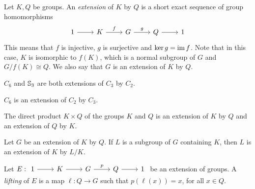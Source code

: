 \chapter{}



Let $K,Q$ be groups.
An {\em extension} of $K$ by $Q$ is a
short exact sequence of group homomorphisms 
\[
\begin{tikzcd}
	1 & K & G & Q & 1
	\arrow[from=1-1, to=1-2]
	\arrow["f", from=1-2, to=1-3]
	\arrow["g", from=1-3, to=1-4]
	\arrow[from=1-4, to=1-5]
\end{tikzcd}
\]
This means that $f$ is injective, $g$ is surjective and $\ker g=\operatorname{im} f$. Note that in this case, $K$ is isomorphic to $f(K)$, which is a normal subgroup of $G$ and $G/f(K)\cong Q$. We also say that $G$ is an extension of $K$ by $Q$.

\begin{example}
	$C_6$ and $\mathbb{S}_3$ are both extensions of $C_3$ by $C_2$.
\end{example}

\begin{example}
	$C_6$ is an extension of $C_2$ by $C_3$.
\end{example}

\begin{example}
    The direct product $K\times Q$ of the groups $K$ and $Q$ 
    is an extension of $K$ by $Q$ and an extension of $Q$ by $K$. 
\end{example}

\begin{example}
Let $G$ be an extension of $K$ by $Q$. If $L$ is a subgroup of $G$ containing $K$, 
then $L$ is an extension
of $K$ by $L/K$.
\end{example}

Let $E:
\begin{tikzcd}
	1 & K & G & Q & 1
	\arrow[from=1-1, to=1-2]
	\arrow[from=1-2, to=1-3]
	\arrow["p", from=1-3, to=1-4]
	\arrow[from=1-4, to=1-5]
\end{tikzcd}$
be an extension of groups. A {\em lifting} of $E$ is a map $\ell\colon
Q\to G$ such that $p(\ell(x))=x$, for all $x\in Q$. 


